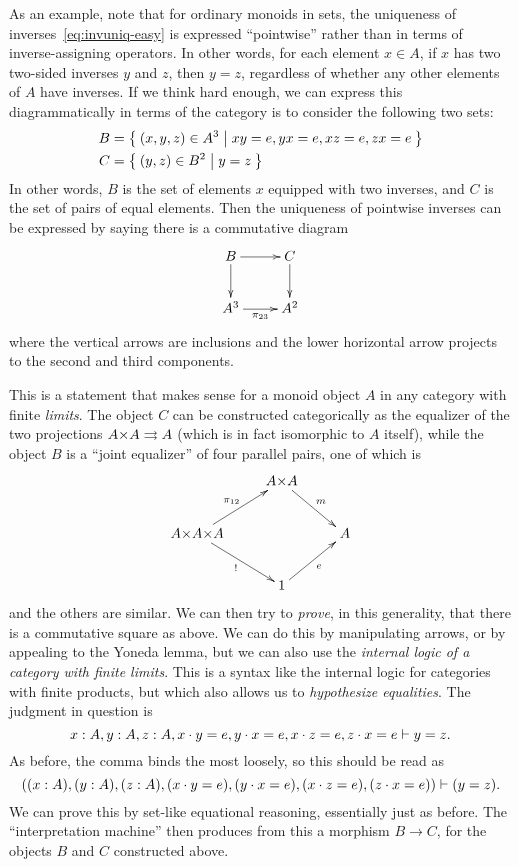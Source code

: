 As an example, note that for ordinary monoids in sets, the uniqueness of inverses~\eqref{eq:invuniq-easy} is expressed ``pointwise'' rather than in terms of inverse-assigning operators.
In other words, for each element $x\in A$, if $x$ has two two-sided inverses $y$ and $z$, then $y=z$, regardless of whether any other elements of $A$ have inverses.
If we think hard enough, we can express this diagrammatically in terms of the category \bSet is to consider the following two sets:
\begin{align*}
  B &= \Set{(x,y,z)\in A^3 | xy=e, yx=e, xz=e, zx=e}\\
  C &= \Set{(y,z)\in B^2 | y=z}
\end{align*}
In other words, $B$ is the set of elements $x$ equipped with two inverses, and $C$ is the set of pairs of equal elements.
Then the uniqueness of pointwise inverses can be expressed by saying there is a commutative diagram
\[ \xymatrix{ B \ar[d] \ar[r] & C \ar[d] \\ A^3 \ar[r]_{\pi_{23}} & A^2 } \]
where the vertical arrows are inclusions and the lower horizontal arrow projects to the second and third components.

This is a statement that makes sense for a monoid object $A$ in any category with finite \emph{limits}.
The object $C$ can be constructed categorically as the equalizer of the two projections $A\times A \toto A$ (which is in fact isomorphic to $A$ itself), while the object $B$ is a ``joint equalizer'' of four parallel pairs, one of which is
\[ \vcenter{\xymatrix{ & A \times A \ar[dr]^m \\
    A\times A\times A \ar[ur]^{\pi_{12}} \ar[dr]_{!} && A \\
    & 1 \ar[ur]_e }} \]
and the others are similar.
We can then try to \emph{prove}, in this generality, that there is a commutative square as above.
We can do this by manipulating arrows, or by appealing to the Yoneda lemma, but we can also use the \emph{internal logic of a category with finite limits}.
This is a syntax like the internal logic for categories with finite products, but which also allows us to \emph{hypothesize equalities}.
The judgment in question is
\begin{equation}\label{eq:pointwise-unique-inverses}
  x:A, y:A, z:A, x\cdot y = e, y\cdot x=e, x\cdot z = e, z\cdot x = e \types y=z.
\end{equation}
As before, the comma binds the most loosely, so this should be read as
\[ ((x:A), (y:A), (z:A), (x\cdot y = e), (y\cdot x=e), (x\cdot z = e), (z\cdot x = e)) \vdash (y=z). \]
We can prove this by set-like equational reasoning, essentially just as before.
The ``interpretation machine'' then produces from this a morphism $B\to C$, for the objects $B$ and $C$ constructed above.


